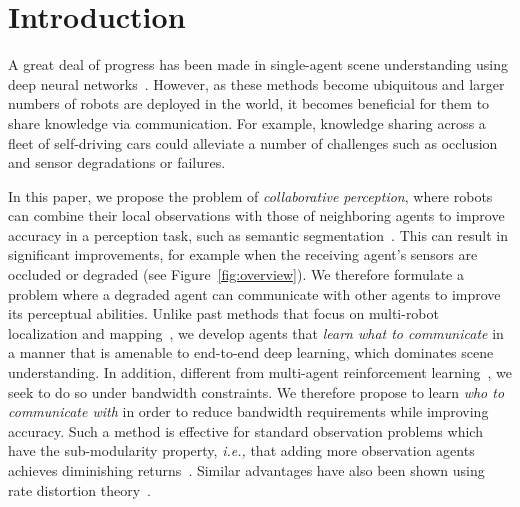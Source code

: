 \section{Introduction}
A great deal of progress has been made in single-agent scene understanding using deep neural networks~\cite{Zhao_2017_CVPR,godard2017unsupervised,Chen_2019_CVPR}. 
However, as these methods become ubiquitous and larger numbers of robots are deployed in the world, it becomes beneficial for them to share knowledge via communication. For example, knowledge sharing across a fleet of self-driving cars could alleviate a number of challenges such as occlusion and sensor degradations or failures.

In this paper, we propose the problem of \textit{collaborative perception}, where robots can combine their local observations with those of neighboring agents to improve accuracy in a perception task, such as semantic segmentation~\cite{long2015fully,chen2017rethinking}. 
This can result in significant improvements, for example when the receiving agent's sensors are occluded or degraded (see Figure~\ref{fig:overview}). We therefore formulate a problem where a degraded agent can communicate with other agents to improve its perceptual abilities. 
Unlike past methods that focus on multi-robot localization and mapping~\cite{cunningham2010ddf, saeedi2016multiple}, we develop agents that \textit{learn what to communicate} in a manner that is amenable to end-to-end deep learning, which dominates scene understanding.
In addition, different from multi-agent reinforcement learning~\cite{sukhbaatar2016learning,battaglia2016interaction,foerster2016dial,peng2017multiagent,jiang2018learning,pesce2019improving,foerster2018counterfactual}, we seek to do so under bandwidth constraints. We therefore propose to learn \textit{who to communicate with} in order to reduce bandwidth requirements while improving accuracy. Such a method is effective for standard observation problems which have the sub-modularity property, \textit{i.e.,} that adding more observation agents achieves diminishing returns~\cite{krause2007near}. Similar advantages have also been shown using rate distortion theory~\cite{dobbe2017fully}. 



